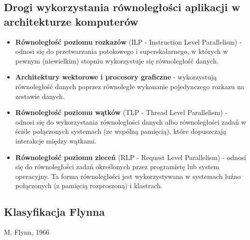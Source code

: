 	\subsection{Drogi wykorzystania równoległości aplikacji w architekturze komputerów}
		\begin{itemize}
			\item \textbf{Równoległość poziomu rozkazów} (ILP - Instruction Level Parallelism) - odnosi się do przetwarzania potokowego i superskalarnego, w których w pewnym (niewielkim) stopniu wykorzystuje się równoległość danych.
			\item \textbf{Architektury wektorowe i procesory graficzne} - wykorzystują równoległość danych poprzez równoległe wykonanie pojedynczego rozkazu na zestawie danych.
			\item \textbf{Równoległość poziomu wątków} (TLP - Thread Level Parallelism) - odnosi się do wykorzystania równoległości danych albo równoległości zadań w ściśle połączonych systemach (ze wspólną pamięcią), które dopuszczają interakcje między wątkami.
			\item \textbf{Równoległość poziomu zleceń} (RLP - Request Level Parallelism) - odnosi się do równoległości zadań określonych przez programistę lub system operacyjny. Ta forma równoległości jest wykorzystywana w systemach luźno połączonych (z pamięcią rozproszoną) i klastrach.
		\end{itemize}
	
	\subsection{Klasyfikacja Flynna}
		M. Flynn, 1966
